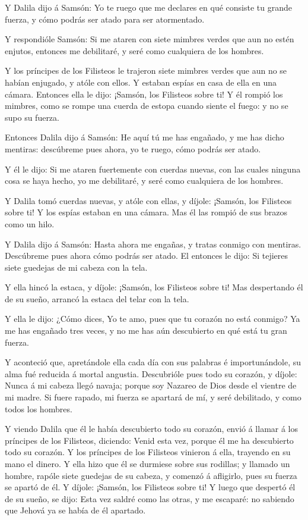  Y Dalila dijo á Samsón: Yo te ruego que me declares en qué
consiste tu grande fuerza, y cómo podrás ser atado para ser atormentado.

 Y respondióle Samsón: Si me ataren con siete mimbres verdes
que aun no estén enjutos, entonces me debilitaré, y seré como cualquiera
de los hombres.

 Y los príncipes de los Filisteos le trajeron siete mimbres
verdes que aun no se habían enjugado, y atóle con ellos.  Y
estaban espías en casa de ella en una cámara. Entonces ella le dijo:
¡Samsón, los Filisteos sobre ti! Y él rompió los mimbres, como se rompe
una cuerda de estopa cuando siente el fuego: y no se supo su fuerza.

 Entonces Dalila dijo á Samsón: He aquí tú me has engañado,
y me has dicho mentiras: descúbreme pues ahora, yo te ruego, cómo podrás
ser atado.

 Y él le dijo: Si me ataren fuertemente con cuerdas nuevas,
con las cuales ninguna cosa se haya hecho, yo me debilitaré, y seré como
cualquiera de los hombres.

 Y Dalila tomó cuerdas nuevas, y atóle con ellas, y díjole:
¡Samsón, los Filisteos sobre ti! Y los espías estaban en una cámara. Mas
él las rompió de sus brazos como un hilo.

 Y Dalila dijo á Samsón: Hasta ahora me engañas, y tratas
conmigo con mentiras. Descúbreme pues ahora cómo podrás ser atado. El
entonces le dijo: Si tejieres siete guedejas de mi cabeza con la tela.

 Y ella hincó la estaca, y díjole: ¡Samsón, los Filisteos
sobre ti! Mas despertando él de su sueño, arrancó la estaca del telar
con la tela.

 Y ella le dijo: ¿Cómo dices, Yo te amo, pues que tu
corazón no está conmigo? Ya me has engañado tres veces, y no me has aún
descubierto en qué está tu gran fuerza.

 Y aconteció que, apretándole ella cada día con sus
palabras é importunándole, su alma fué reducida á mortal angustia.
 Descubrióle pues todo su corazón, y díjole: Nunca á mi
cabeza llegó navaja; porque soy Nazareo de Dios desde el vientre de mi
madre. Si fuere rapado, mi fuerza se apartará de mí, y seré debilitado,
y como todos los hombres.

 Y viendo Dalila que él le había descubierto todo su
corazón, envió á llamar á los príncipes de los Filisteos, diciendo:
Venid esta vez, porque él me ha descubierto todo su corazón. Y los
príncipes de los Filisteos vinieron á ella, trayendo en su mano el
dinero.  Y ella hizo que él se durmiese sobre sus rodillas;
y llamado un hombre, rapóle siete guedejas de su cabeza, y comenzó á
afligirlo, pues su fuerza se apartó de él.  Y díjole:
¡Samsón, los Filisteos sobre ti! Y luego que despertó él de su sueño, se
dijo: Esta vez saldré como las otras, y me escaparé: no sabiendo que
Jehová ya se había de él apartado.


